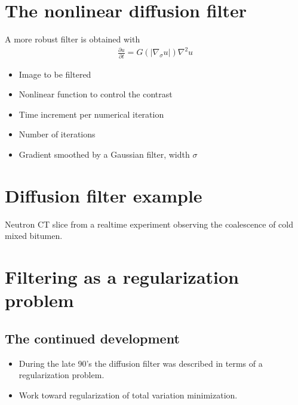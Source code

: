 \documentclass[letterpaper,10pt,english]{sphinxmanual}
\begin{document}
\section{The non\sphinxhyphen{}linear diffusion filter}
\label{\detokenize{02-ImageEnhancement:the-non-linear-diffusion-filter}}
\sphinxAtStartPar
A more robust filter is obtained with
\begin{equation*}
\begin{split}\frac{\partial u}{\partial t}=G(|\nabla_{\sigma} u|)\nabla^2u\end{split}
\end{equation*}\begin{itemize}
\item {} 
\sphinxAtStartPar
{} Image to be filtered

\item {} 
\sphinxAtStartPar
{} Non\sphinxhyphen{}linear function to control the contrast

\item {} 
\sphinxAtStartPar
\sphinxstyleemphasis{\(\tau\)} Time increment per numerical iteration

\item {} 
\sphinxAtStartPar
{} Number of iterations

\item {} 
\sphinxAtStartPar
\sphinxstyleemphasis{\(\nabla_{\sigma}\)} Gradient smoothed by a Gaussian filter, width \(\sigma\)

\end{itemize}


\section{Diffusion filter example}
\label{\detokenize{02-ImageEnhancement:diffusion-filter-example}}
\sphinxAtStartPar
Neutron CT slice from a real\sphinxhyphen{}time experiment observing the coalescence of cold mixed bitumen.




\section{Filtering as a regularization problem}
\label{\detokenize{02-ImageEnhancement:filtering-as-a-regularization-problem}}

\subsection{The continued development}
\label{\detokenize{02-ImageEnhancement:the-continued-development}}\begin{itemize}
\item {} 
\sphinxAtStartPar
{} During the late 90’s the diffusion filter was described in terms of a regularization problem.

\item {} 
\sphinxAtStartPar
{} Work toward regularization of total variation minimization.

\end{itemize}
\end{document}

